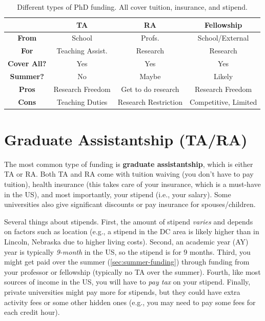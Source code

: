 \documentclass[oneside,11pt,dvipsnames]{book}
\begin{document}
\begin{table}
  \centering
  \small
  \caption{Different types of PhD funding. All cover tuition, insurance, and stipend.}\label{tab:funding}
  \begin{tabular}{c|c|c|c}
    \toprule
    &\textbf{TA}&\textbf{RA}&\textbf{Fellowship}\\
    \midrule
    \textbf{From} & School & Profs. & School/External\\
    \textbf{For}                  & Teaching Assist.       & Research                        & Research                              \\
    \textbf{Cover All?} & Yes                      & Yes                             & Yes                                   \\
    \textbf{Summer?}              & No                       & Maybe                           & Likely                                   \\
    \midrule
    \textbf{Pros}                 & Research Freedom         & Get to do research              & Research Freedom                      \\
    \textbf{Cons}                 & Teaching Duties           & Research Restriction & Competitive, Limited             \\
    \bottomrule
  \end{tabular}
\end{table}

\section{Graduate Assistantship (TA/RA)}\label{sec:ta-ra}
The most common type of funding is \textbf{graduate assistantship}, which is either TA or RA. Both TA and RA come with tuition waiving (you don't have to pay tuition), health insurance (this takes care of your insurance, which is a must-have in the US), and most importantly, your stipend (i.e., your salary). Some universities also give significant discounts or pay insurance for spouses/children.

Several things about stipends.  First, the amount of stipend \emph{varies} and depends on factors such as location (e.g., a stipend in the DC area is likely higher than in Lincoln, Nebraska due to higher living costs). Second, an academic year (AY)  year is typically \emph{9-month} in the US, so the stipend is for 9 months. Third, you might get paid over the summer (\autoref{sec:summer-funding}) through funding from your professor or fellowship (typically no TA over the summer). Fourth, like most sources of income in the US, you will have to \emph{pay tax} on your stipend.  Finally, private universities might pay more for stipends, but they could have extra activity fees or some other hidden ones (e.g., you may need to pay some fees for each credit hour).
\end{document}

